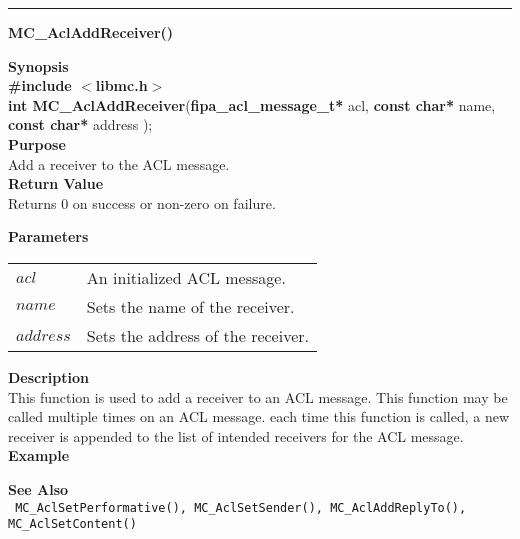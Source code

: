 \noindent
\vspace{5pt}
\rule{6.5in}{0.015in}
\noindent
{}
{\LARGE \bf MC\_AclAddReceiver()}\\
\label{api:MC_Acl_AddReceiver()}

\noindent
{\bf Synopsis}\\
{\bf \#include $<$libmc.h$>$}\\
{\bf int MC\_AclAddReceiver}({\bf fipa\_acl\_message\_t*} acl, {\bf const char*} name, {\bf const char*} address );\\

\noindent
{\bf Purpose}\\
Add a receiver to the ACL message.\\

\noindent
{\bf Return Value}\\
Returns 0 on success or non-zero on failure.

\noindent
{\bf Parameters}
\vspace{-0.1in}
\begin{description}
\item
\begin{tabular}{p{10 mm}p{145 mm}} 
$acl$ & An initialized ACL message. \\
$name$ & Sets the name of the receiver. \\
$address$ & Sets the address of the receiver. 
\end{tabular}
\end{description}

\noindent
{\bf Description}\\
This function is used to add a receiver to an ACL message. This function 
may be called multiple times on an ACL message. each time this function is 
called, a new receiver is appended to the list of intended receivers
for the ACL message. \\

\noindent
{\bf Example}\\
\noindent
{\footnotesize}

\noindent
{\bf See Also}\\
\texttt{
  MC\_AclSetPerformative(), MC\_AclSetSender(), MC\_AclAddReplyTo(), 
\linebreak MC\_AclSetContent()}



